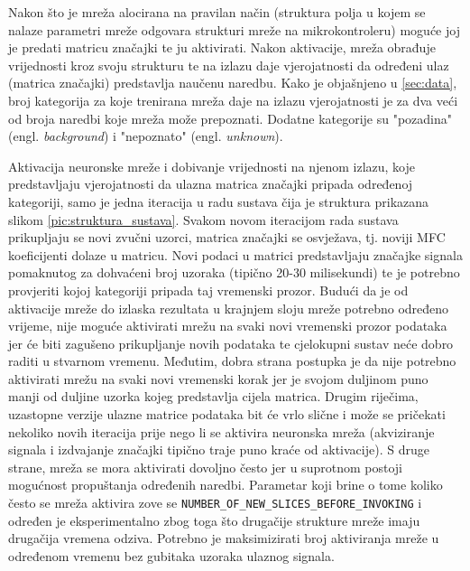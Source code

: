 Nakon što je mreža alocirana na pravilan način (struktura polja u kojem se nalaze parametri
mreže odgovara strukturi mreže na mikrokontroleru) moguće joj je predati matricu značajki
te ju aktivirati. Nakon aktivacije, mreža obrađuje vrijednosti kroz svoju strukturu te na
izlazu daje vjerojatnosti da određeni ulaz (matrica značajki) predstavlja naučenu naredbu.
Kako je objašnjeno u \ref{sec:data}, broj kategorija za koje trenirana mreža daje na izlazu
vjerojatnosti je za dva veći od broja naredbi koje mreža može prepoznati. Dodatne kategorije
su "pozadina" (engl. \textit{background}) i "nepoznato" (engl. \textit{unknown}). 

Aktivacija neuronske mreže i dobivanje vrijednosti na njenom izlazu, koje predstavljaju
vjerojatnosti da ulazna matrica značajki pripada određenoj kategoriji, samo je jedna iteracija 
u radu sustava čija je struktura prikazana slikom \ref{pic:struktura_sustava}. Svakom novom 
iteracijom rada sustava prikupljaju se novi zvučni uzorci, matrica značajki se osvježava, 
tj. noviji MFC koeficijenti dolaze u matricu. Novi podaci u matrici predstavljaju značajke 
signala pomaknutog za dohvaćeni broj uzoraka (tipično 20-30 milisekundi) te je potrebno provjeriti
kojoj kategoriji pripada taj vremenski prozor. Budući da je od aktivacije mreže do izlaska 
rezultata u krajnjem sloju mreže potrebno određeno vrijeme, nije moguće aktivirati mrežu 
na svaki novi vremenski prozor podataka jer će biti zagušeno prikupljanje novih podataka
te cjelokupni sustav neće dobro raditi u stvarnom vremenu. Međutim, dobra strana postupka je da
nije potrebno aktivirati mrežu na svaki novi vremenski korak jer je svojom duljinom
puno manji od duljine uzorka kojeg predstavlja cijela matrica. Drugim riječima, uzastopne
verzije ulazne matrice podataka bit će vrlo slične i može se pričekati nekoliko novih
iteracija prije nego li se aktivira neuronska mreža (akviziranje signala i izdvajanje značajki
tipično traje puno kraće od aktivacije). S druge strane, mreža se mora aktivirati dovoljno
često jer u suprotnom postoji mogućnost propuštanja određenih naredbi. Parametar koji brine o tome 
koliko često se mreža aktivira zove se \texttt{NUMBER\_OF\_NEW\_SLICES\_BEFORE\_INVOKING} i određen
je eksperimentalno zbog toga što drugačije strukture mreže imaju drugačija vremena odziva.
Potrebno je maksimizirati broj aktiviranja mreže u određenom vremenu bez gubitaka
uzoraka ulaznog signala.

